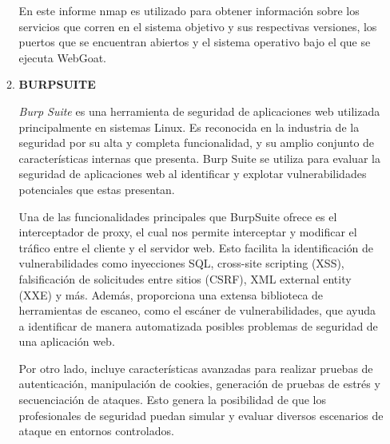 \documentclass[12pt,oneside,a4paper]{book}
\begin{document}
\begin{enumerate}
\begin{enumerate}
        \hspace{20pt}
        En este informe nmap es utilizado para obtener información sobre los servicios que corren en el sistema objetivo y sus respectivas versiones, los puertos que se encuentran abiertos y el sistema operativo bajo el que se ejecuta WebGoat.

        \vspace{2em}

        \item{\textbf{BURPSUITE}}

        \vspace{1em}

        \hspace{20pt}
        \textit{Burp Suite} es una herramienta  de seguridad de aplicaciones web utilizada principalmente en sistemas Linux. Es reconocida en la industria de la seguridad por su alta y completa funcionalidad, y su amplio conjunto de características internas que presenta. Burp Suite se utiliza para evaluar la seguridad de aplicaciones web al identificar y explotar vulnerabilidades potenciales que estas presentan.

        \vspace{1em}

        \hspace{20pt}
        Una de las funcionalidades principales que BurpSuite ofrece es el interceptador de proxy, el cual nos permite interceptar y modificar el tráfico entre el cliente y el servidor web. Esto facilita la identificación de vulnerabilidades como inyecciones SQL, cross-site scripting (XSS), falsificación de solicitudes entre sitios (CSRF), XML external entity (XXE) y más. Además, proporciona una extensa biblioteca de herramientas de escaneo, como el escáner de vulnerabilidades, que ayuda a identificar de manera automatizada posibles problemas de seguridad de una aplicación web.

        \vspace{1em}

        \hspace{20pt}
        Por otro lado, incluye características avanzadas para realizar pruebas de autenticación, manipulación de cookies, generación de pruebas de estrés y secuenciación de ataques. Esto genera la posibilidad de que los profesionales de seguridad puedan simular y evaluar diversos escenarios de ataque en entornos controlados.

        \vspace{1em}


\end{enumerate}
\end{enumerate}
\end{document}
